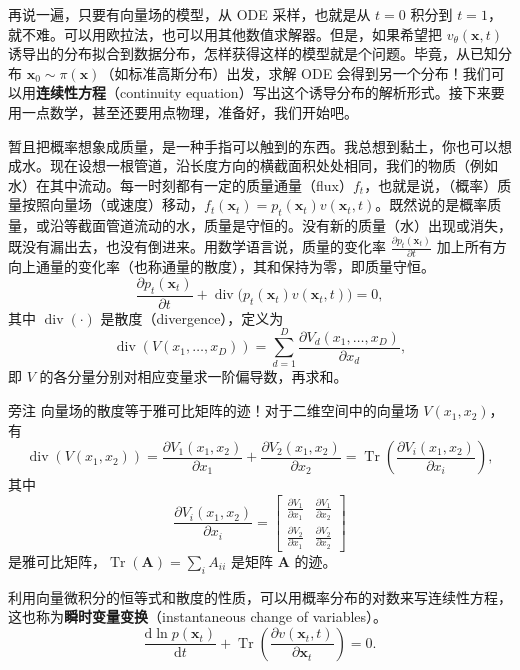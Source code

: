 再说一遍，只要有向量场的模型，从 ODE 采样，也就是从 $t=0$ 积分到 $t=1$，就不难。可以用欧拉法，也可以用其他数值求解器。但是，如果希望把 $v_\theta(\mathbf x,t)$ 诱导出的分布拟合到数据分布，怎样获得这样的模型就是个问题。毕竟，从已知分布 $\mathbf x_0\sim\pi(\mathbf x)$（如标准高斯分布）出发，求解 ODE 会得到另一个分布！我们可以用\textbf{连续性方程}（continuity equation）写出这个诱导分布的解析形式。接下来要用一点数学，甚至还要用点物理，准备好，我们开始吧。

暂且把概率想象成质量，是一种手指可以触到的东西。我总想到黏土，你也可以想成水。现在设想一根管道，沿长度方向的横截面积处处相同，我们的物质（例如水）在其中流动。每一时刻都有一定的质量通量（flux）$f_t$，也就是说，（概率）质量按照向量场（或速度）移动，$f_t(\mathbf x_t)=p_t(\mathbf x_t)v(\mathbf x_t,t)$。既然说的是概率质量，或沿等截面管道流动的水，质量是守恒的。没有新的质量（水）出现或消失，既没有漏出去，也没有倒进来。用数学语言说，质量的变化率 $\frac{\partial p_t(\mathbf x_t)}{\partial t}$ 加上所有方向上通量的变化率（也称通量的散度），其和保持为零，即质量守恒。
\begin{equation}
  \frac{\partial p_t(\mathbf x_t)}{\partial t}
    +\operatorname{div}\bigl(p_t(\mathbf x_t)v(\mathbf x_t,t)\bigr)=0,
  \tag{9.40}\label{eq:09-40}
\end{equation}
其中 $\operatorname{div}(\cdot)$ 是散度（divergence），定义为
\[
  \operatorname{div}(V(x_1,\ldots,x_D))
    =\sum_{d=1}^{D}\frac{\partial V_d(x_1,\ldots,x_D)}{\partial x_d},
\]
即 $V$ 的各分量分别对相应变量求一阶偏导数，再求和。

\begin{booknote}{旁注}
向量场的散度等于雅可比矩阵的迹！对于二维空间中的向量场 $V(x_1,x_2)$，有
\[
  \operatorname{div}(V(x_1,x_2))=
  \frac{\partial V_1(x_1,x_2)}{\partial x_1}+
  \frac{\partial V_2(x_1,x_2)}{\partial x_2}
  =\operatorname{Tr}\left(\frac{\partial V_i(x_1,x_2)}{\partial x_i}\right),
\]
其中
\[
  \frac{\partial V_i(x_1,x_2)}{\partial x_i}=
  \begin{bmatrix}
    \frac{\partial V_1}{\partial x_1}&\frac{\partial V_1}{\partial x_2}\\
    \frac{\partial V_2}{\partial x_1}&\frac{\partial V_2}{\partial x_2}
  \end{bmatrix}
\]
是雅可比矩阵，$\operatorname{Tr}(\mathbf A)=\sum_i A_{ii}$ 是矩阵 $\mathbf A$ 的迹。
\end{booknote}

利用向量微积分的恒等式和散度的性质，可以用概率分布的对数来写连续性方程，这也称为\textbf{瞬时变量变换}（instantaneous change of variables）。
\begin{equation}
  \frac{\mathrm d\ln p(\mathbf x_t)}{\mathrm dt}+
  \operatorname{Tr}\left(\frac{\partial v(\mathbf x_t,t)}{\partial\mathbf x_t}\right)=0.
  \tag{9.41}\label{eq:09-41}
\end{equation}

